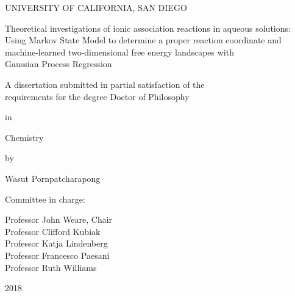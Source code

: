 \begin{titlepage}\begin{center}
    UNIVERSITY OF CALIFORNIA, SAN DIEGO

    \vspace{1cm}

    {Theoretical investigations of ionic association reactions in aqueous solutions: \\ 
    Using Markov State Model to determine a proper reaction coordinate and \\
    machine-learned two-dimensional free energy landscapes with \\ 
    Gaussian Process Regression}

    \vspace{1cm}

    {A dissertation submitted in partial satisfaction of the \\
    requirements for the degree Doctor of Philosophy}

    \vspace{1.3cm}

    in

    \vspace{0.7cm}

    Chemistry

    \vspace{1.3cm}

    by

    \vspace{0.7cm}

    Wasut Pornpatcharapong
\end{center}

\vspace{1.3cm}

\noindent Committee in charge:

\noindent\hspace{0.5in} Professor John Weare, Chair \\
\noindent\hspace*{0.5in} Professor Clifford Kubiak \\
\noindent\hspace*{0.5in} Professor Katja Lindenberg \\
\noindent\hspace*{0.5in} Professor Francesco Paesani \\
\noindent\hspace*{0.5in} Professor Ruth Williams

\vspace{0.7cm}

\begin{center}
    2018
\end{center}\end{titlepage}
